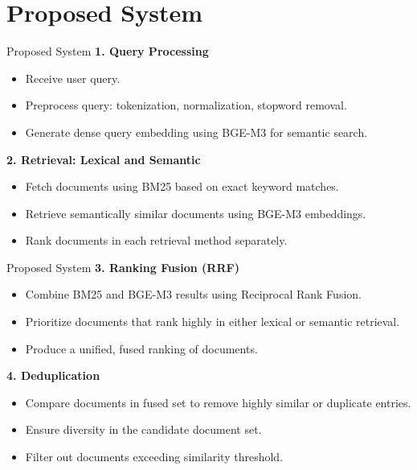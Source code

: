 \section{Proposed System}

\begin{frame}{Proposed System}
\textbf{1. Query Processing}
\begin{itemize}
    \item Receive user query.
    \item Preprocess query: tokenization, normalization, stopword removal.
    \item Generate dense query embedding using BGE-M3 for semantic search.
\end{itemize}

\vspace{0.3cm}

\textbf{2. Retrieval: Lexical and Semantic}
\begin{itemize}
    \item Fetch documents using BM25 based on exact keyword matches.
    \item Retrieve semantically similar documents using BGE-M3 embeddings.
    \item Rank documents in each retrieval method separately.
\end{itemize}
\end{frame}

\begin{frame}{Proposed System}
\textbf{3. Ranking Fusion (\textbf{RRF})}
\begin{itemize}
    \item Combine BM25 and BGE-M3 results using Reciprocal Rank Fusion.
    \item Prioritize documents that rank highly in either lexical or semantic retrieval.
    \item Produce a unified, fused ranking of documents.
\end{itemize}

\vspace{0.3cm}

\textbf{4. Deduplication}
\begin{itemize}
    \item Compare documents in fused set to remove highly similar or duplicate entries.
    \item Ensure diversity in the candidate document set.
    \item Filter out documents exceeding similarity threshold.
\end{itemize}
\end{frame}

